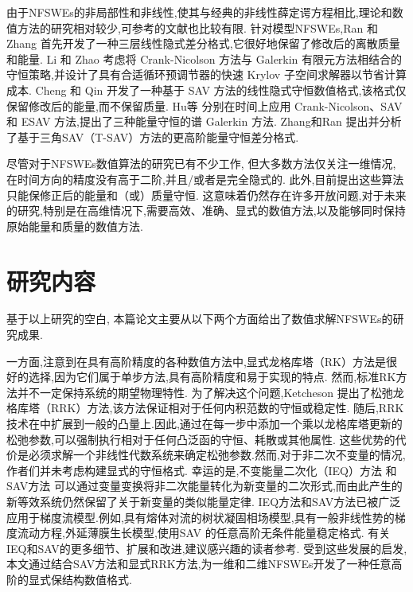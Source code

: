 由于NFSWEs的非局部性和非线性,使其与经典的非线性薛定谔方程相比,理论和数值方法的研究相对较少,可参考的文献也比较有限.
针对模型NFSWEs,Ran 和 Zhang \cite{ranLinearlyImplicitConservative2016} 首先开发了一种三层线性隐式差分格式,它很好地保留了修改后的离散质量和能量. 
Li 和 Zhao \cite{liFastEnergyConserving2018} 考虑将 Crank-Nicolson 方法与 Galerkin 有限元方法相结合的守恒策略,并设计了具有合适循环预调节器的快速 Krylov 子空间求解器以节省计算成本. 
Cheng 和 Qin \cite{chengConvergenceEnergyconservingScheme2022} 开发了一种基于 SAV 方法的线性隐式守恒数值格式,该格式仅保留修改后的能量,而不保留质量.
Hu等 \cite{huEfficientEnergyPreserving2022} 分别在时间上应用 Crank-Nicolson、SAV 和 ESAV 方法,提出了三种能量守恒的谱 Galerkin 方法.
Zhang和Ran \cite{zhangHighorderStructurepreservingDifference2023} 提出并分析了基于三角SAV（T-SAV）方法的更高阶能量守恒差分格式.


尽管对于NFSWEs数值算法的研究已有不少工作, 但大多数方法仅关注一维情况, 在时间方向的精度没有高于二阶,并且/或者是完全隐式的.
此外,目前提出这些算法只能保修正后的能量和（或）质量守恒.
这意味着仍然存在许多开放问题,对于未来的研究,特别是在高维情况下,需要高效、准确、显式的数值方法,以及能够同时保持原始能量和质量的数值方法.

\section{研究内容}
基于以上研究的空白, 本篇论文主要从以下两个方面给出了数值求解NFSWEs的研究成果.

一方面,注意到在具有高阶精度的各种数值方法中,显式龙格库塔（RK）方法是很好的选择,因为它们属于单步方法,具有高阶精度和易于实现的特点.
然而,标准RK方法并不一定保持系统的期望物理特性.
为了解决这个问题,Ketcheson \cite{ketchesonRelaxationRungeKutta2019} 提出了松弛龙格库塔（RRK）方法,该方法保证相对于任何内积范数的守恒或稳定性.
随后,RRK技术在\cite{ranochaRelaxationRungeKutta2020}中扩展到一般的凸量上.因此,通过在每一步中添加一个乘以龙格库塔更新的松弛参数,可以强制执行相对于任何凸泛函的守恒、耗散或其他属性.
这些优势的代价是必须求解一个非线性代数系统来确定松弛参数.然而,对于非二次不变量的情况,作者们并未考虑构建显式的守恒格式.
幸运的是,不变能量二次化（IEQ）方法 \cite{yangLinearUnconditionallyEnergy2017, yangEfficientLinearSchemes2017} 和SAV方法 \cite{chengConvergenceEnergyconservingScheme2022} 可以通过变量变换将非二次能量转化为新变量的二次形式,而由此产生的新等效系统仍然保留了关于新变量的类似能量定律.
IEQ方法和SAV方法已被广泛应用于梯度流模型.例如,具有熔体对流\cite{chenEfficientNumericalScheme2019}的树状凝固相场模型,具有一般非线性势的梯度流动方程\cite{yangConvergenceAnalysisInvariant2020},外延薄膜生长模型\cite{chengHighlyEfficientAccurate2019},使用SAV \cite{gongArbitrarilyHighorderUnconditionally2019}的任意高阶无条件能量稳定格式.
有关IEQ和SAV的更多细节、扩展和改进,建议感兴趣的读者参考\cite{zhaoNumericalApproximationsPhase2017,shenScalarAuxiliaryVariable2018,liuExponentialScalarAuxiliary2020,chengMultipleScalarAuxiliary2018}.
受到这些发展的启发,本文通过结合SAV方法和显式RRK方法,为一维和二维NFSWEs开发了一种任意高阶的显式保结构数值格式.

